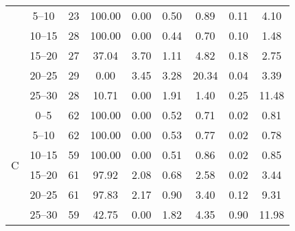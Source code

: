 \begin{table}[htb]
{\begin{tabular}[t]{ccccccccc}
			                     & \SIrange{5}{10}{}               & 23                      & 100.00            & 0.00              & \SI{0.50}{}                       & \SI{0.89}{}  & \SI{0.11}{} & \SI{4.10}{}  \\
			                     & \SIrange{10}{15}{}              & 28                      & 100.00            & 0.00              & \SI{0.44}{}                       & \SI{0.70}{}  & \SI{0.10}{} & \SI{1.48}{}  \\
			                     & \SIrange{15}{20}{}              & 27                      & 37.04             & 3.70              & \SI{1.11}{}                       & \SI{4.82}{}  & \SI{0.18}{} & \SI{2.75}{}  \\
			                     & \SIrange{20}{25}{}              & 29                      & 0.00              & 3.45              & \SI{3.28}{}                       & \SI{20.34}{} & \SI{0.04}{} & \SI{3.39}{}  \\
			                     & \SIrange{25}{30}{}              & 28                      & 10.71             & 0.00              & \SI{1.91}{}                       & \SI{1.40}{}  & \SI{0.25}{} & \SI{11.48}{} \\
			\hline
			
			\multirow{6}{*}{C}   & \SIrange{0}{5}{}                & 62                      & 100.00            & 0.00              & \SI{0.52}{}                       & \SI{0.71}{}  & \SI{0.02}{} & \SI{0.81}{}  \\
			                     & \SIrange{5}{10}{}               & 62                      & 100.00            & 0.00              & \SI{0.53}{}                       & \SI{0.77}{}  & \SI{0.02}{} & \SI{0.78}{}  \\
			                     & \SIrange{10}{15}{}              & 59                      & 100.00            & 0.00              & \SI{0.51}{}                       & \SI{0.86}{}  & \SI{0.02}{} & \SI{0.85}{}  \\
			                     & \SIrange{15}{20}{}              & 61                      & 97.92             & 2.08              & \SI{0.68}{}                       & \SI{2.58}{}  & \SI{0.02}{} & \SI{3.44}{}  \\
			                     & \SIrange{20}{25}{}              & 61                      & 97.83             & 2.17              & \SI{0.90}{}                       & \SI{3.40}{}  & \SI{0.12}{} & \SI{9.31}{}  \\
			                     & \SIrange{25}{30}{}              & 59                      & 42.75             & 0.00              & \SI{1.82}{}                       & \SI{4.35}{}  & \SI{0.90}{} & \SI{11.98}{} \\
			\bottomrule
		\end{tabular}
	}
\end{table}

